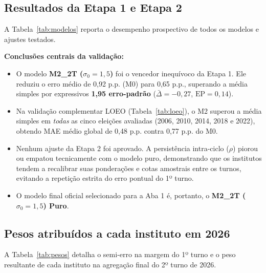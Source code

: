 \documentclass[10.5pt,a4paper]{article}
\begin{document}
\subsection{Resultados da Etapa 1 e Etapa 2}

A Tabela~\ref{tab:modelos} reporta o desempenho prospectivo de todos os modelos e ajustes testados.

\begin{table}[h]
\centering\small
\caption{Validação temporal do 2º turno em Expanding Window (MAE em p.p.).}
\label{tab:modelos}

\end{table}

\textbf{Conclusões centrais da validação:}
\begin{itemize}
    \item O modelo \textbf{M2\_2T ($\sigma_0=1{,}5$)} foi o vencedor inequívoco da Etapa 1. Ele reduziu o erro médio de 0,92 p.p. (M0) para 0,65 p.p., superando a média simples por expressivos \textbf{1,95 erro-padrão} ($\bar{\Delta} = -0{,}27$, $\text{EP} = 0{,}14$).
    \item Na validação complementar LOEO (Tabela~\ref{tab:loeo}), o M2 superou a média simples em \emph{todas} as cinco eleições avaliadas (2006, 2010, 2014, 2018 e 2022), obtendo MAE médio global de 0,48 p.p. contra 0,77 p.p. do M0.
    \item Nenhum ajuste da Etapa 2 foi aprovado. A persistência intra-ciclo ($\rho$) piorou ou empatou tecnicamente com o modelo puro, demonstrando que os institutos tendem a recalibrar suas ponderações e cotas amostrais entre os turnos, evitando a repetição estrita do erro pontual do 1º turno.
    \item O modelo final oficial selecionado para a Aba 1 é, portanto, o \textbf{M2\_2T ($\sigma_0=1{,}5$) Puro}.
\end{itemize}

\begin{table}[h]
\centering\small
\caption{Validação complementar Leave-One-Election-Out (LOEO, 2006 a 2022).}
\label{tab:loeo}

\end{table}

\subsection{Pesos atribuídos a cada instituto em 2026}

A Tabela~\ref{tab:pesos} detalha o semi-erro na margem do 1º turno e o peso resultante de cada instituto na agregação final do 2º turno de 2026.
\end{document}
